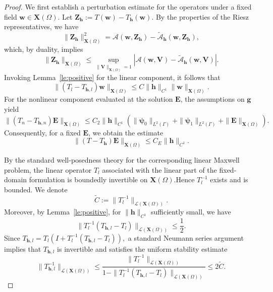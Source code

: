 \documentclass[10pt,a4paper]{amsart}
\numberwithin{equation}{section}
\begin{document}
\begin{proof}
We first establish a perturbation estimate for the operators under a fixed field $\mathbf{w} \in \mathbf{X}(\Omega)$. Let $\mathbf{Z}_{\mathbf{h}} := T(\mathbf{w}) - T_{\mathbf{h}}(\mathbf{w})$. By the properties of the Riesz representatives, we have
\[
\|\mathbf{Z}_{\mathbf{h}}\|_{\mathbf{X}(\Omega)}^2 = \mathcal{A}(\mathbf{w}, \mathbf{Z}_{\mathbf{h}}) - \widetilde{\mathcal{A}}_{\mathbf{h}}(\mathbf{w}, \mathbf{Z}_{\mathbf{h}}),
\]
which, by duality, implies
\[
\|\mathbf{Z}_{\mathbf{h}}\|_{\mathbf{X}(\Omega)} \le \sup_{\|\mathbf{V}\|_{\mathbf{X}(\Omega)}=1} \left| \mathcal{A}(\mathbf{w}, \mathbf{V}) - \widetilde{\mathcal{A}}_{\mathbf{h}}(\mathbf{w}, \mathbf{V}) \right|.
\]
Invoking Lemma~\ref{le:positive} for the linear component, it follows that
\[
\|(T_l - T_{\mathbf{h},l})\mathbf{w}\|_{\mathbf{X}(\Omega)} \le C \|\mathbf{h}\|_{C^1} \|\mathbf{w}\|_{\mathbf{X}(\Omega)}.
\]
For the nonlinear component evaluated at the solution $\mathbf{E}$, the assumptions on $\mathbf{g}$ yield
\[
\|(T_n - T_{\mathbf{h},n})\mathbf{E}\|_{\mathbf{X}(\Omega)} \le C_2 \|\mathbf{h}\|_{C^1} \left( \|\boldsymbol{\psi}_0\|_{L^2(\Gamma)} + \|\boldsymbol{\psi}_1\|_{L^2(\Gamma)} + \|\mathbf{E}\|_{\mathbf{X}(\Omega)} \right).
\]
Consequently, for a fixed $\mathbf{E}$, we obtain the estimate
\begin{equation}
\label{eq:operator_perturbation_impedance}
\|(T - T_{\mathbf{h}})\mathbf{E}\|_{\mathbf{X}(\Omega)} \le C_E \|\mathbf{h}\|_{C^1}.
\end{equation}

By the standard well-posedness theory for the corresponding linear Maxwell
problem, the linear operator \(T_l\) associated with the linear part of the
fixed-domain formulation is boundedly invertible on \(\mathbf X(\Omega)\).Hence \(T_l^{-1}\) exists and is bounded. We denote
\[
\widetilde C:=\|T_l^{-1}\|_{\mathcal L(\mathbf X(\Omega))}.
\]
Moreover, by Lemma~\ref{le:positive}, for
\(\|\mathbf h\|_{C^1}\) sufficiently small, we have
\[
\|T_l^{-1}(T_{\mathbf h,l}-T_l)\|_{\mathcal L(\mathbf X(\Omega))}\le
\frac12 .
\]
Since
$T_{\mathbf h,l}=T_l\left(I+T_l^{-1}(T_{\mathbf h,l}-T_l)
\right),$
a standard Neumann series argument implies that \(T_{\mathbf h,l}\) is
invertible and satisfies the uniform stability estimate
\[
\|T_{\mathbf h,l}^{-1}\|_{\mathcal L(\mathbf X(\Omega))}
\le\frac{\|T_l^{-1}\|_{\mathcal L(\mathbf X(\Omega))}
}{1-\|T_l^{-1}(T_{\mathbf h,l}-T_l)\|_{\mathcal L(\mathbf X(\Omega))}
}\le2\widetilde C .\]


\end{proof}
\end{document}
